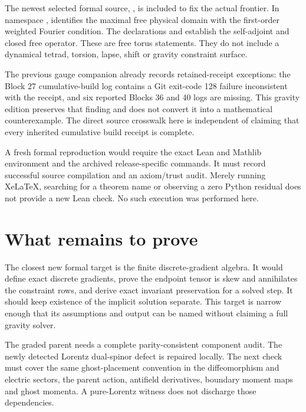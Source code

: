 The newest selected formal source, , is included to fix the actual frontier. In namespace ,  identifies the maximal free physical domain with the first-order weighted Fourier condition. The declarations  and  establish the self-adjoint and closed free operator. These are free torus statements. They do not include a dynamical tetrad, torsion, lapse, shift or gravity constraint surface.

The previous gauge companion already records retained-receipt exceptions: the Block 27 cumulative-build log contains a Git exit-code 128 failure inconsistent with the receipt, and six reported Blocks 36 and 40 logs are missing. This gravity edition preserves that finding and does not convert it into a mathematical counterexample. The direct source crosswalk here is independent of claiming that every inherited cumulative build receipt is complete.

A fresh formal reproduction would require the exact Lean and Mathlib environment and the archived release-specific commands. It must record successful source compilation and an axiom/trust audit. Merely running XeLaTeX, searching for a theorem name or observing a zero Python residual does not provide a new Lean check. No such execution was performed here.



\clearpage
\section{What remains to prove}\label{c:verify:remaining}

The closest new formal target is the finite discrete-gradient algebra. It would define exact discrete gradients, prove the endpoint tensor is skew and annihilates the constraint rows, and derive exact invariant preservation for a solved step. It should keep existence of the implicit solution separate. This target is narrow enough that its assumptions and output can be named without claiming a full gravity solver.

The graded parent needs a complete parity-consistent component audit. The newly detected Lorentz dual-spinor defect is repaired locally. The next check must cover the same ghost-placement convention in the diffeomorphism and electric sectors, the parent action, antifield derivatives, boundary moment maps and ghost momenta. A pure-Lorentz witness does not discharge those dependencies.

